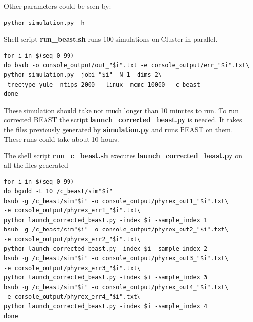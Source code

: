 Other parameters could be seen by:

\begin{verbatim}
python simulation.py -h
\end{verbatim}


Shell script \textbf{run\_beast.sh} runs 100 simulations on Cluster in parallel.
\begin{verbatim}
for i in $(seq 0 99)
do bsub -o console_output/out_"$i".txt -e console_output/err_"$i".txt\
python simulation.py -jobi "$i" -N 1 -dims 2\
-treetype yule -ntips 2000 --linux -mcmc 10000 --c_beast
done
\end{verbatim}


These simulation should take not much longer than 10 minutes to run. To run corrected BEAST the script \textbf{launch\_corrected\_beast.py} is needed. It takes the files previously generated by \textbf{simulation.py} and runs BEAST on them. These runs could take about 10 hours.

The shell script \textbf{run\_c\_beast.sh} executes \textbf{launch\_corrected\_beast.py} on all the files generated.
\begin{verbatim}
for i in $(seq 0 99)
do bgadd -L 10 /c_beast/sim"$i"
bsub -g /c_beast/sim"$i" -o console_output/phyrex_out1_"$i".txt\
-e console_output/phyrex_err1_"$i".txt\
python launch_corrected_beast.py -index $i -sample_index 1
bsub -g /c_beast/sim"$i" -o console_output/phyrex_out2_"$i".txt\
-e console_output/phyrex_err2_"$i".txt\
python launch_corrected_beast.py -index $i -sample_index 2
bsub -g /c_beast/sim"$i" -o console_output/phyrex_out3_"$i".txt\
-e console_output/phyrex_err3_"$i".txt\
python launch_corrected_beast.py -index $i -sample_index 3
bsub -g /c_beast/sim"$i" -o console_output/phyrex_out4_"$i".txt\
-e console_output/phyrex_err4_"$i".txt\
python launch_corrected_beast.py -index $i -sample_index 4
done
\end{verbatim}


